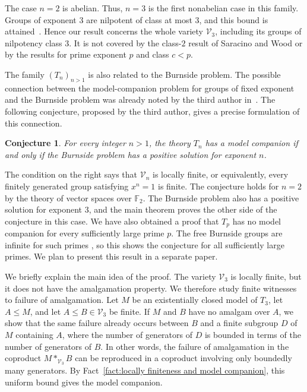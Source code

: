\documentclass[11pt,reqno]{article}
\newtheorem{conjecture}[theorem]{Conjecture}
\theoremstyle{definition}
\theoremstyle{remark}
\begin{document}
The case $n=2$ is abelian.
Thus, $n=3$ is the first nonabelian case in this family.
Groups of exponent $3$ are nilpotent of class at most $3$, and this bound is attained~\cite{LeviVanDerWaerden1933}.
Hence our result concerns the whole variety $\mathcal V_3$, including its groups of nilpotency class $3$.
It is not covered by the class-$2$ result of Saracino and Wood or by the results for prime exponent $p$ and class $c<p$.

The family $(T_n)_{n>1}$ is also related to the Burnside problem.
The possible connection between the model-companion problem for groups of fixed exponent and the Burnside problem was already noted by the third author in~\cite{Takeuchi2022}.
The following conjecture, proposed by the third author, gives a precise formulation of this connection.

\begin{conjecture}\label{conj:burnside-model-companion}
For every integer $n>1$, the theory $T_n$ has a model companion if and only if the Burnside problem has a positive solution for exponent $n$.
\end{conjecture}

The condition on the right says that $\mathcal V_n$ is locally finite, or equivalently, every finitely generated group satisfying $x^n=1$ is finite.
The conjecture holds for $n=2$ by the theory of vector spaces over $\mathbb F_2$.
The Burnside problem also has a positive solution for exponent $3$, and the main theorem proves the other side of the conjecture in this case.
We have also obtained a proof that $T_p$ has no model companion for every sufficiently large prime $p$.
The free Burnside groups are infinite for such primes \cite{Ivanov1992}, so this shows the conjecture for all sufficiently large primes.
We plan to present this result in a separate paper.

We briefly explain the main idea of the proof.
The variety $\mathcal V_3$ is locally finite, but it does not have the amalgamation property.
We therefore study finite witnesses to failure of amalgamation.
Let $M$ be an existentially closed model of $T_3$, let $A\leq M$, and let $A\leq B\in\mathcal V_3$ be finite.
If $M$ and $B$ have no amalgam over $A$, we show that the same failure already occurs between $B$ and a finite subgroup $D$ of $M$ containing $A$, where the number of generators of $D$ is bounded in terms of the number of generators of $B$.
In other words, the failure of amalgamation in the coproduct $M*_{\mathcal V_3}B$ can be reproduced in a coproduct involving only boundedly many generators.
By Fact~\ref{fact:locally finiteness and model companion}, this uniform bound gives the model companion.
\end{document}
